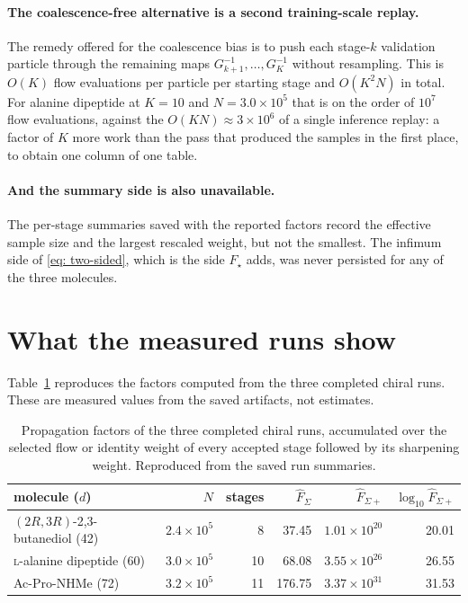 \documentclass[11pt]{article}
\theoremstyle{plain}
\begin{document}
\paragraph{The coalescence-free alternative is a second training-scale replay.}
The remedy offered for the coalescence bias is to push each stage-$k$
validation particle through the remaining maps $G_{k+1}^{-1},\dots,G_K^{-1}$
without resampling. This is $O(K)$ flow evaluations per particle per starting
stage and $O(K^2N)$ in total. For alanine dipeptide at $K=10$ and
$N=3.0\times10^{5}$ that is on the order of $10^{7}$ flow evaluations, against
the $O(KN)\approx3\times10^{6}$ of a single inference replay: a factor of $K$
more work than the pass that produced the samples in the first place, to
obtain one column of one table.

\paragraph{And the summary side is also unavailable.} The per-stage summaries
saved with the reported factors record the effective sample size and the
largest rescaled weight, but not the smallest. The infimum side of
\eqref{eq: two-sided}, which is the side $F_\star$ adds, was never persisted
for any of the three molecules.

\section{What the measured runs show}

Table~\ref{tab: measured} reproduces the factors computed from the three
completed chiral runs. These are measured values from the saved artifacts, not
estimates.

\begin{table}[htb]
\centering
\begin{tabular}{lrrrrr}
\toprule
molecule ($d$) & $N$ & stages & $\hat F_\Sigma$ & $\hat F_{\Sigma+}$ & $\log_{10}\hat F_{\Sigma+}$\\
\midrule
$(2R,3R)$-2,3-butanediol (42) & $2.4\times10^5$ & 8  & 37.45  & $1.01\times10^{20}$ & 20.01\\
\textsc{l}-alanine dipeptide (60) & $3.0\times10^5$ & 10 & 68.08  & $3.55\times10^{26}$ & 26.55\\
Ac-Pro-NHMe (72)              & $3.2\times10^5$ & 11 & 176.75 & $3.37\times10^{31}$ & 31.53\\
\bottomrule
\end{tabular}
\caption{Propagation factors of the three completed chiral runs, accumulated
over the selected flow or identity weight of every accepted stage followed by
its sharpening weight. Reproduced from the saved run summaries.}
\label{tab: measured}
\end{table}
\end{document}
